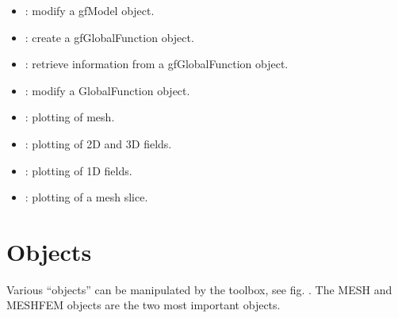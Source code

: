 \documentclass[a4paper,11pt,english]{sphinxmanual}
\begin{document}
\begin{itemize}
\item {} 
\sphinxAtStartPar
{} : modify a gfModel object.

\item {} 
\sphinxAtStartPar
{} : create a gfGlobalFunction object.

\item {} 
\sphinxAtStartPar
{} : retrieve information from a gfGlobalFunction object.

\item {} 
\sphinxAtStartPar
{} : modify a GlobalFunction object.

\item {} 
\sphinxAtStartPar
{} : plotting of mesh.

\item {} 
\sphinxAtStartPar
{} : plotting of 2D and 3D fields.

\item {} 
\sphinxAtStartPar
{} : plotting of 1D fields.

\item {} 
\sphinxAtStartPar
{} : plotting of a mesh slice.

\end{itemize}


\section{Objects}
\label{\detokenize{scilab/scilabgf:objects}}
\sphinxAtStartPar
Various “objects” can be manipulated by the  toolbox, see fig.
{\hyperref[\detokenize{scilab/scilabgf:scilab-fig-hierarchy}]{}}. The MESH and MESHFEM objects are the two most
important objects.
\end{document}
